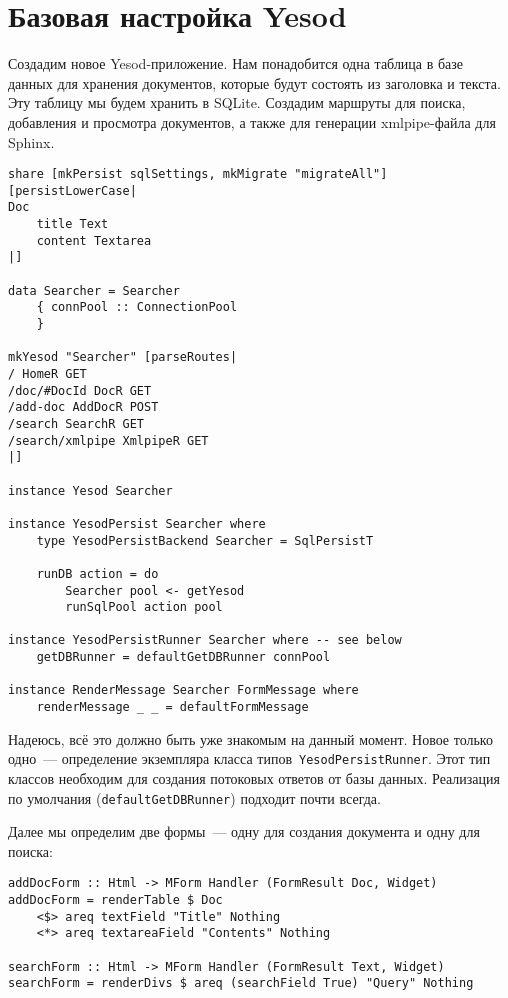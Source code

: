 \section{Базовая настройка Yesod}
Создадим новое Yesod-приложение. Нам понадобится одна таблица в базе данных для хранения документов, которые будут состоять из заголовка и текста. Эту таблицу мы будем хранить в SQLite. Создадим маршруты для поиска, добавления и просмотра документов, а также для генерации xmlpipe-файла для Sphinx.
\begin{lstlisting}
share [mkPersist sqlSettings, mkMigrate "migrateAll"] [persistLowerCase|
Doc
    title Text
    content Textarea
|]

data Searcher = Searcher
    { connPool :: ConnectionPool
    }

mkYesod "Searcher" [parseRoutes|
/ HomeR GET
/doc/#DocId DocR GET
/add-doc AddDocR POST
/search SearchR GET
/search/xmlpipe XmlpipeR GET
|]

instance Yesod Searcher

instance YesodPersist Searcher where
    type YesodPersistBackend Searcher = SqlPersistT

    runDB action = do
        Searcher pool <- getYesod
        runSqlPool action pool

instance YesodPersistRunner Searcher where -- see below
    getDBRunner = defaultGetDBRunner connPool

instance RenderMessage Searcher FormMessage where
    renderMessage _ _ = defaultFormMessage
\end{lstlisting}

Надеюсь, всё это должно быть уже знакомым на данный момент. Новое только одно~--- определение экземпляра класса типов~\lstinline'YesodPersistRunner'. Этот тип классов необходим для создания потоковых ответов от базы данных. Реализация по умолчания (\lstinline'defaultGetDBRunner') подходит почти всегда.

Далее мы определим две формы~--- одну для создания документа и одну для поиска:
\begin{lstlisting}
addDocForm :: Html -> MForm Handler (FormResult Doc, Widget)
addDocForm = renderTable $ Doc
    <$> areq textField "Title" Nothing
    <*> areq textareaField "Contents" Nothing

searchForm :: Html -> MForm Handler (FormResult Text, Widget)
searchForm = renderDivs $ areq (searchField True) "Query" Nothing
\end{lstlisting}%

